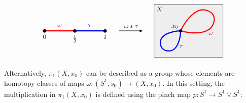 \vskip -2mm
\begin{equation*}
\begin{tikzpicture}[
    scale = 1,
    d0/.style = {line width = 1.6pt},
    d1/.style= {postaction={decorate}, line width = 1.6pt, decoration={markings, mark=at position 0.55 with {\arrow[rotate=-2]{stealth}}}},
    d2/.style = {postaction={decorate}, line width = 1.6pt, decoration={markings, mark=at position 0.54 with {\arrow[rotate=4]{stealth}}}}
]

\draw[d0, red] (0,0) -- node[anchor=south, yshift = 2pt] {\small $\omega$} (1.5, 0); 
\draw[d0, myblue] (1.5,0) --  node[anchor=south, yshift = 2pt] {\small $\tau$} (3, 0); 
\filldraw (0,0) circle (0.08) node[anchor = north, yshift = -2pt] {\small $0$};
\filldraw (1.5,0) circle (0.08) node[anchor = north, yshift = -2pt] {\small $\frac{1}{2}$};
\filldraw (3,0) circle (0.08) node[anchor = north, yshift = -2pt] {\small $1$};

\draw[thick, ->, >=latex] (3.7, 0) -- node[anchor= south] {\small $\omega\ast \tau$}(4.9, 0);


\begin{scope}[scale=0.6, xshift = 320pt]
\draw[fill = mygray1] (-2.2, -2.2) rectangle (3.5, 2.2);
\draw[d0, red, rotate=25, , yscale = 0.9]  
(0,0) .. controls (0,0) and (1,1) .. 
(2, 1) .. controls (2.5,1) and (3, 0.5).. 
(3,0)  ..controls (3, -0.5) and (2.5, -1)..  
(2,-1) ..controls (1, -1) and (0,0).. 
cycle;
\node[red] at (2.5, -0.2)  {\small $\omega$} ;

\draw[d0, myblue, rotate = -135, scale = 0.7]
(0,0) .. controls (0,0) and (1,1) .. 
(2, 1) .. controls (2.5,1) and (3, 0.5).. 
(3,0)  ..controls (3, -0.5) and (2.5, -1)..  
(2,-1) ..controls (1, -1) and (0,0).. 
cycle; 
\node[myblue] at (0.05, -1.3)  {\small $\tau$} ;

\draw[fill = black] (0,0) circle (0.12) node[anchor=south east] {\small $x_{0}$};
\node[anchor = north west] at (-2.2, 2.2) {\small $X$};

\end{scope}
\end{tikzpicture}
\end{equation*}

Alternatively, $\pi_{1}(X, x_{0})$ can be described as a group whose elements are homotopy 
classes of maps $\omega \colon (S^{1}, s_{0}) \to (X, x_{0})$. In this setting, 
the multiplication in $\pi_{1}(X, x_{0})$ is defined using the pinch map 
$p\colon S^{1} \to S^{1}\vee S^{1}$:


